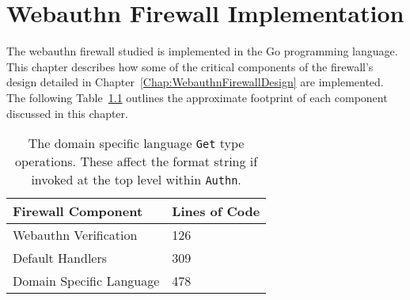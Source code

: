 

\chapter{Webauthn Firewall Implementation}\label{Chap:WebauthnFirewallImplementation}

The webauthn firewall studied is implemented in the Go programming language. This chapter describes how some of the critical components of the firewall's design detailed in Chapter~\ref{Chap:WebauthnFirewallDesign} are implemented. The following Table~\ref{Table:ImplementationFootprint} outlines the approximate footprint of each component discussed in this chapter.

\begin{table}[h]
\centering

\begin{tabular}{ m{5cm} m{3cm}  } 
 \hline
 Firewall Component & Lines of Code \\ 
 \hline \hline

 Webauthn Verification & 126 \\ \hline

 Default Handlers & 309 \\ \hline

 Domain Specific Language & 478 \\ \hline

\end{tabular}
\caption{The domain specific language \lstinline{Get} type operations. These affect the format string if invoked at the top level within \lstinline|Authn|.}
\label{Table:ImplementationFootprint}
\end{table}


